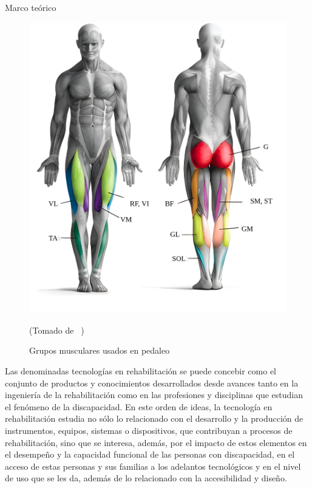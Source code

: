 \begin{thesischapter}{1} {Marco teórico}
    \begin{figure}[ht]
        \centering
        \includegraphics[scale=0.2]{images/musculegroups.png}
        \caption{Grupos musculares usados en pedaleo}
        (Tomado de ~\cite{Quémúsc72})
        \label{fig: musculegroups}
    \end{figure}

    \vspace{10pt}
    Las denominadas tecnologías en rehabilitación se puede concebir como el conjunto de productos y conocimientos desarrollados desde avances tanto en la ingeniería de la rehabilitación como en las profesiones y disciplinas que estudian el fenómeno de la discapacidad. En este orden de ideas, la tecnología en rehabilitación estudia no sólo lo relacionado con el desarrollo y la producción de instrumentos, equipos, sistemas o dispositivos, que contribuyan a procesos de rehabilitación, sino que se interesa, además, por el impacto de estos elementos en el desempeño y la capacidad funcional de las personas con discapacidad, en el acceso de estas personas y sus familias a los adelantos tecnológicos y en el nivel de uso que se les da, además de lo relacionado con la accesibilidad y diseño.\cite{matheus1990tecnologia}


\end{thesischapter}
